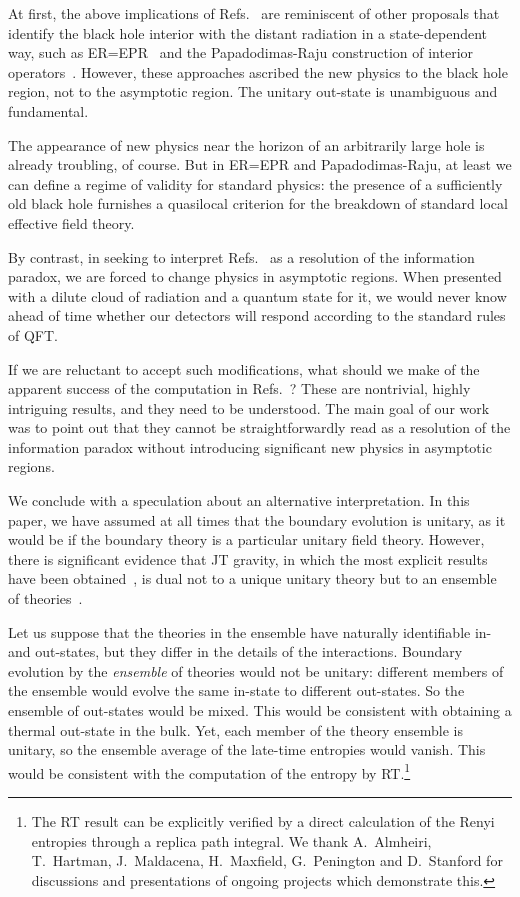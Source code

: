 \documentclass[12pt,letterpaper]{article}
\begin{document}
At first, the above implications of Refs.~\cite{Pen19,AEMM} are reminiscent of other proposals that identify the black hole interior with the distant radiation in a state-dependent way, such as ER=EPR~\cite{MalSus13} and the Papadodimas-Raju construction of interior operators~\cite{PapRaj12,PapRaj13b}. However, these approaches ascribed the new physics to the black hole region, not to the asymptotic region. The unitary out-state is unambiguous and fundamental.

The appearance of new physics near the horizon of an arbitrarily large hole is already troubling, of course. But in ER=EPR and Papadodimas-Raju, at least we can define a regime of validity for standard physics: the presence of a sufficiently old black hole furnishes a quasilocal criterion for the breakdown of standard local effective field theory.

By contrast, in seeking to interpret Refs.~\cite{Pen19,AEMM} as a resolution of the information paradox, we are forced to change physics in asymptotic regions. When presented with a dilute cloud of radiation and a quantum state for it, we would never know ahead of time whether our detectors will respond according to the standard rules of QFT.

If we are reluctant to accept such modifications, what should we make of the apparent success of the computation in Refs.~\cite{Pen19,AEMM}? These are nontrivial, highly intriguing results, and they need to be understood. The main goal of our work was to point out that they cannot be straightforwardly read as a resolution of the information paradox without introducing significant new physics in asymptotic regions.

We conclude with a speculation about an alternative interpretation. In this paper, we have assumed at all times that the boundary evolution is unitary, as it would be if the boundary theory is a particular unitary field theory. However, there is significant evidence that JT gravity, in which the most explicit results have been obtained~\cite{AEMM}, is dual not to a unique unitary theory but to an ensemble of theories~\cite{SaaShe18,SaaShe19}.

Let us suppose that the theories in the ensemble have naturally identifiable in- and out-states, but they differ in the details of the interactions. Boundary evolution by the {\em ensemble\/} of theories would not be unitary: different members of the ensemble would evolve the same in-state to different out-states. So the ensemble of out-states would be mixed. This would be consistent with obtaining a thermal out-state in the bulk. Yet, each member of the theory ensemble is unitary, so the ensemble average of the late-time entropies would vanish. This would be consistent with the computation of the entropy by RT.\footnote{The RT result can be explicitly verified by a direct calculation of the Renyi entropies through a replica path integral. We thank A.~Almheiri, T.~Hartman, J.~Maldacena, H.~Maxfield, G.~Penington and D.~Stanford for discussions and presentations of ongoing projects which demonstrate this.}
\end{document}

